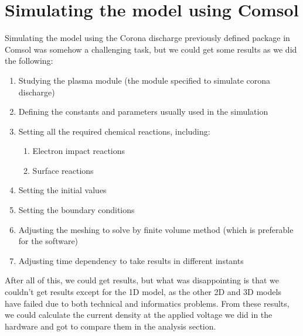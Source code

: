 \section*{Simulating the model using Comsol}
\hspace{\parindent} Simulating the model using the Corona discharge previously defined package in Comsol was somehow a challenging task, but we could get some results as we did the following:
\begin{enumerate}
    \item Studying the plasma module (the module specified to simulate corona discharge)
    \item Defining the constants and parameters usually used in the simulation
    \item Setting all the required chemical reactions, including:
            \begin{enumerate}
                \item Electron impact reactions
                \item Surface reactions
                
            \end{enumerate}
    \item Setting the initial values 
    \item Setting the boundary conditions 
    \item Adjusting the meshing to solve by finite volume method (which is preferable for the software)
    \item Adjusting time dependency to take results in different instants
    
\end{enumerate}
\hspace{\parindent}After all of this, we could get results, but what was disappointing is that we couldn't get results except for the 1D model, as the other 2D and 3D models have failed due to both technical and informatics problems.
\hspace{\parindent}From these results, we could calculate the current density at the applied voltage we did in the hardware and got to compare them in the analysis section.

